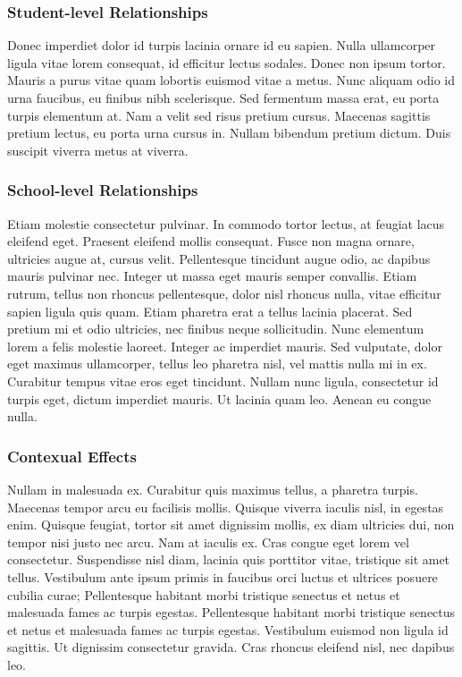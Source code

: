 \subsubsection{Student-level Relationships}

Donec imperdiet dolor id turpis lacinia ornare id eu sapien. Nulla ullamcorper ligula vitae lorem consequat, id efficitur lectus sodales. Donec non ipsum tortor. Mauris a purus vitae quam lobortis euismod vitae a metus. Nunc aliquam odio id urna faucibus, eu finibus nibh scelerisque. Sed fermentum massa erat, eu porta turpis elementum at. Nam a velit sed risus pretium cursus. Maecenas sagittis pretium lectus, eu porta urna cursus in. Nullam bibendum pretium dictum. Duis suscipit viverra metus at viverra.

\subsubsection{School-level Relationships}

Etiam molestie consectetur pulvinar. In commodo tortor lectus, at feugiat lacus eleifend eget. Praesent eleifend mollis consequat. Fusce non magna ornare, ultricies augue at, cursus velit. Pellentesque tincidunt augue odio, ac dapibus mauris pulvinar nec. Integer ut massa eget mauris semper convallis. Etiam rutrum, tellus non rhoncus pellentesque, dolor nisl rhoncus nulla, vitae efficitur sapien ligula quis quam. Etiam pharetra erat a tellus lacinia placerat. Sed pretium mi et odio ultricies, nec finibus neque sollicitudin. Nunc elementum lorem a felis molestie laoreet. Integer ac imperdiet mauris. Sed vulputate, dolor eget maximus ullamcorper, tellus leo pharetra nisl, vel mattis nulla mi in ex. Curabitur tempus vitae eros eget tincidunt. Nullam nunc ligula, consectetur id turpis eget, dictum imperdiet mauris. Ut lacinia quam leo. Aenean eu congue nulla.

\subsubsection{Contexual Effects}

Nullam in malesuada ex. Curabitur quis maximus tellus, a pharetra turpis. Maecenas tempor arcu eu facilisis mollis. Quisque viverra iaculis nisl, in egestas enim. Quisque feugiat, tortor sit amet dignissim mollis, ex diam ultricies dui, non tempor nisi justo nec arcu. Nam at iaculis ex. Cras congue eget lorem vel consectetur. Suspendisse nisl diam, lacinia quis porttitor vitae, tristique sit amet tellus. Vestibulum ante ipsum primis in faucibus orci luctus et ultrices posuere cubilia curae; Pellentesque habitant morbi tristique senectus et netus et malesuada fames ac turpis egestas. Pellentesque habitant morbi tristique senectus et netus et malesuada fames ac turpis egestas. Vestibulum euismod non ligula id sagittis. Ut dignissim consectetur gravida. Cras rhoncus eleifend nisl, nec dapibus leo.
